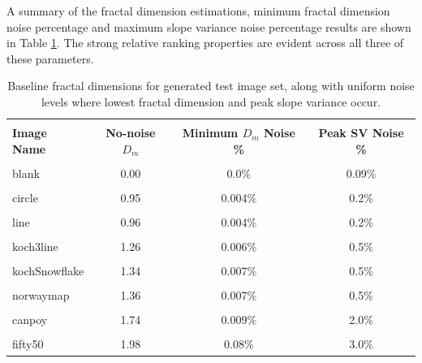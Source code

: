 \documentclass[12pt, oneside]{book}
\begin{document}
A summary of the fractal dimension estimations, minimum fractal dimension noise percentage and maximum slope variance noise percentage results are shown in Table \ref{tab:base_dimensions}.  The strong relative ranking properties are evident across all three of these parameters.

\begin{table}[!b]
    {\hspace{0cm}
    \begin{tabular}{|p{3cm}|c|c|c|}
    \hline & & & \\ [-1.5ex]
    \textbf{Image Name}  & \textbf{No-noise \(D_{m}\)} & \textbf{Minimum \(D_{m}\) Noise \%} & \textbf{Peak SV Noise \%}\\
    \hline & & & \\ [-1.5ex]
    blank         & 0.00 & 0.0\%   & 0.09\% \\
    \hline & & & \\ [-1.5ex]
    circle        & 0.95 & 0.004\% & 0.2\% \\
    \hline & & &  \\ [-1.5ex]
    line          & 0.96 & 0.004\% & 0.2\% \\
    \hline & & &  \\ [-1.5ex]
    koch3line     & 1.26 & 0.006\% & 0.5\% \\
    \hline & & &  \\ [-1.5ex]
    kochSnowflake & 1.34 & 0.007\% & 0.5\% \\
    \hline & & &  \\ [-1.5ex]
    norwaymap     & 1.36 & 0.007\% & 0.5\% \\
    \hline & & &  \\ [-1.5ex]
    canpoy        & 1.74 & 0.009\% & 2.0\% \\
    \hline & & &  \\ [-1.5ex]
    fifty50       & 1.98 & 0.08\%  & 3.0\% \\
    \hline
    \end{tabular}
    }
    \caption{Baseline fractal dimensions for generated test image set, along with uniform noise levels where lowest fractal dimension and peak slope variance occur.}
    \label{tab:base_dimensions}
\end{table}
\end{document}
